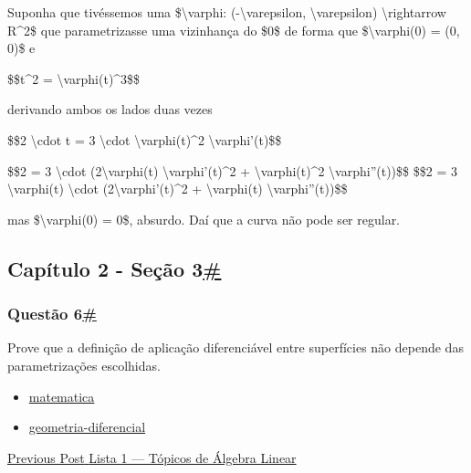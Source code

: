 Suponha que tivéssemos uma \$\textbackslash{}varphi:
(-\textbackslash{}varepsilon, \textbackslash{}varepsilon)
\textbackslash{}rightarrow R\^{}2\$ que parametrizasse uma vizinhança do
\$0\$ de forma que \$\textbackslash{}varphi(0) = (0, 0)\$ e

\$\$t\^{}2 = \textbackslash{}varphi(t)\^{}3\$\$

derivando ambos os lados duas vezes

\$\$2 \textbackslash{}cdot t = 3 \textbackslash{}cdot
\textbackslash{}varphi(t)\^{}2 \textbackslash{}varphi'(t)\$\$

\$\$2 = 3 \textbackslash{}cdot (2\textbackslash{}varphi(t)
\textbackslash{}varphi'(t)\^{}2 + \textbackslash{}varphi(t)\^{}2
\textbackslash{}varphi''(t))\$\$ \$\$2 = 3 \textbackslash{}varphi(t)
\textbackslash{}cdot (2\textbackslash{}varphi'(t)\^{}2 +
\textbackslash{}varphi(t) \textbackslash{}varphi''(t))\$\$

mas \$\textbackslash{}varphi(0) = 0\$, absurdo. Daí que a curva não pode
ser regular.

\hypertarget{capuxedtulo-2---seuxe7uxe3o-3}{%
\subsection{\texorpdfstring{Capítulo 2 - Seção
3\protect\hyperlink{capuxedtulo-2---seuxe7uxe3o-3}{\#}}{Capítulo 2 - Seção 3\#}}\label{capuxedtulo-2---seuxe7uxe3o-3}}

\hypertarget{questuxe3o-6}{%
\subsubsection{\texorpdfstring{Questão
6\protect\hyperlink{questuxe3o-6}{\#}}{Questão 6\#}}\label{questuxe3o-6}}

Prove que a definição de aplicação diferenciável entre superfícies não
depende das parametrizações escolhidas.

\begin{itemize}
\tightlist
\item
  \href{https://impression28.github.io/tags/matematica/}{matematica}
\item
  \href{https://impression28.github.io/tags/geometria-diferencial/}{geometria-diferencial}
\end{itemize}

\href{https://impression28.github.io/exercicios/lista1-tal/}{{Previous
Post} {Lista 1 --- Tópicos de Álgebra Linear}}

\href{https://github.com/impression28}{}

